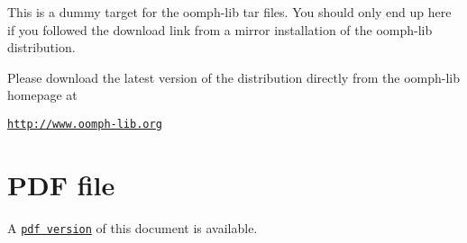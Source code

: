 This is a dummy target for the {\ttfamily oomph-\/lib} tar files. You should only end up here if you followed the download link from a mirror installation of the {\ttfamily oomph-\/lib} distribution.

Please download the latest version of the distribution directly from the {\ttfamily oomph-\/lib} homepage at \begin{center} \href{http://www.oomph-lib.org}{\tt http\+://www.\+oomph-\/lib.\+org} \end{center} 



 

 \hypertarget{index_pdf}{}\section{P\+D\+F file}\label{index_pdf}
A \href{../latex/refman.pdf}{\tt pdf version} of this document is available. 

